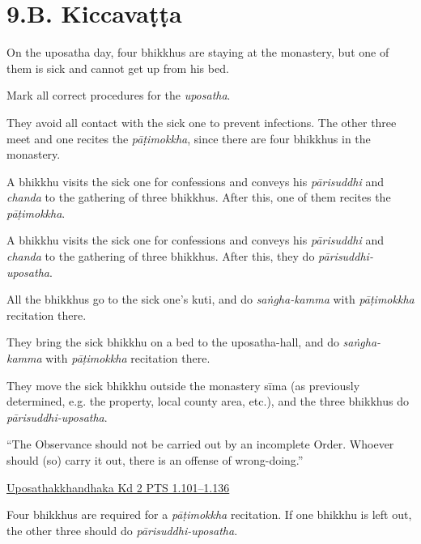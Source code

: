 \chapter{9.B. Kiccavaṭṭa}
\renewcommand*{\theChapterTitle}{9.B. Kiccavaṭṭa}

\begin{exam}{\autoExamName}

\begin{problem}

  On the uposatha day, four bhikkhus are staying at the monastery, but one of
  them is sick and cannot get up from his bed.

  Mark all correct procedures for the \emph{uposatha}.

  \bigskip

  \begin{manswers}{1}
    \bChoices

     They avoid all contact with the sick one to prevent infections. The
    other three meet and one recites the \emph{pāṭimokkha}, since there are four
    bhikkhus in the monastery.\eAns

     A bhikkhu visits the sick one for confessions and conveys his
    \emph{pārisuddhi} and \emph{chanda} to the gathering of three bhikkhus.
    After this, one of them recites the \emph{pāṭimokkha}.\eAns

     A bhikkhu visits the sick one for confessions and conveys his
    \emph{pārisuddhi} and \emph{chanda} to the gathering of three bhikkhus.
    After this, they do \emph{pārisuddhi-uposatha}.\eAns

     All the bhikkhus go to the sick one's kuti, and do \emph{saṅgha-kamma}
    with \emph{pāṭimokkha} recitation there.\eAns

     They bring the sick bhikkhu on a bed to the uposatha-hall, and do
    \emph{saṅgha-kamma} with \emph{pāṭimokkha} recitation there.\eAns

     They move the sick bhikkhu outside the monastery sīma (as previously
    determined, e.g. the property, local county area, etc.), and the three
    bhikkhus do \emph{pārisuddhi-uposatha}.\eAns

    \eChoices
  \end{manswers}

  \begin{solution}
    ``The Observance should not be carried out by an incomplete Order. Whoever
    should (so) carry it out, there is an offense of wrong-doing.''

    \href{https://suttacentral.net/pli-tv-kd2/en/horner-brahmali}{Uposathakkhandhaka Kd 2 PTS 1.101–1.136}

    Four bhikkhus are required for a \emph{pāṭimokkha} recitation. If one
    bhikkhu is left out, the other three should do \emph{pārisuddhi-uposatha}.
  \end{solution}

\end{problem}

\end{exam}

